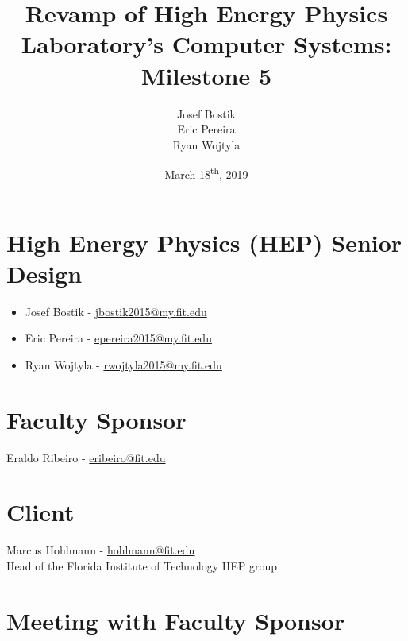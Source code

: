 \documentclass[12pt]{article}
\newcommand\tab[1][1cm]{\hspace*{#1}}
\begin{document}
	

\begin{titlepage}
	
\author{Josef Bostik\\
	Eric Pereira\\
	Ryan Wojtyla\\}
\date{March 18\textsuperscript{th}, 2019}
\title{Revamp of High Energy Physics Laboratory's Computer Systems: Milestone 5}

\maketitle

\end{titlepage}

\tableofcontents

\newpage {}

\section{High Energy Physics (HEP) Senior Design}

\begin{itemize}
	\item Josef Bostik - \href{mailto:jbostik2015@my.fit.edu}{jbostik2015@my.fit.edu}
	\item Eric Pereira - \href{mailto:epereira2015@my.fit.edu}{epereira2015@my.fit.edu }
	\item Ryan Wojtyla - \href{mailto:rwojtyla2015@my.fit.edu}{rwojtyla2015@my.fit.edu}
\end{itemize}

\section{Faculty Sponsor}

\tab Eraldo Ribeiro - \href{mailto:eribeiro@fit.edu}{eribeiro@fit.edu}

\section{Client}

\tab Marcus Hohlmann - \href{mailto:hohlmann@fit.edu}{hohlmann@fit.edu} \\ 
\tab Head of the Florida Institute of Technology HEP group

\section{Meeting with Faculty Sponsor}
\end{document}
